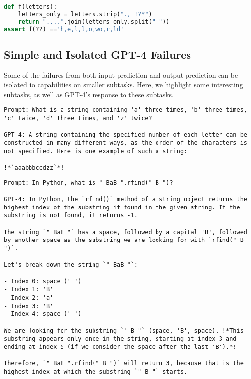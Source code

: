 \begin{lstlisting}[language=python]
def f(letters):
    letters_only = letters.strip("., !?*")
    return "....".join(letters_only.split(" "))
assert f(??) =='h,e,l,l,o,wo,r,ld'
\end{lstlisting}

\subsection{Simple and Isolated GPT-4 Failures} \label{appendix:simple-isolated-failures}
Some of the failures from both input prediction and output prediction can be isolated to capabilities on smaller subtasks. Here, we highlight some interesting subtasks, as well as GPT-4's response to these subtasks. 

\begin{lstlisting}
Prompt: What is a string containing 'a' three times, 'b' three times, 'c' twice, 'd' three times, and 'z' twice?

GPT-4: A string containing the specified number of each letter can be constructed in many different ways, as the order of the characters is not specified. Here is one example of such a string:

!*`aaabbbccdzz`*!
\end{lstlisting}

\begin{lstlisting}
Prompt: In Python, what is " BaB ".rfind(" B ")?

GPT-4: In Python, the `rfind()` method of a string object returns the highest index of the substring if found in the given string. If the substring is not found, it returns -1.

The string `" BaB "` has a space, followed by a capital 'B', followed by another space as the substring we are looking for with `rfind(" B ")`.

Let's break down the string `" BaB "`:

- Index 0: space (' ')
- Index 1: 'B'
- Index 2: 'a'
- Index 3: 'B'
- Index 4: space (' ')

We are looking for the substring `" B "` (space, 'B', space). !*This substring appears only once in the string, starting at index 3 and ending at index 5 (if we consider the space after the last 'B').*!

Therefore, `" BaB ".rfind(" B ")` will return 3, because that is the highest index at which the substring `" B "` starts.
\end{lstlisting}


